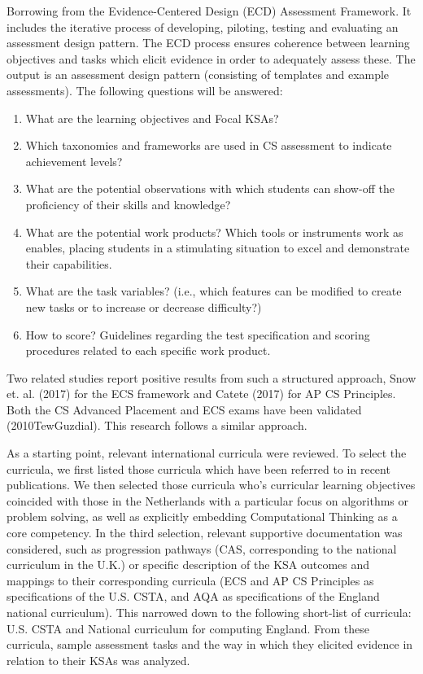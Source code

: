  Borrowing from the Evidence-Centered Design (ECD) Assessment Framework. It includes the iterative process of developing, piloting, testing and evaluating an assessment design pattern. The ECD process ensures coherence between learning objectives and tasks which elicit evidence in order to adequately assess these. The output is an assessment design pattern (consisting of templates and example assessments). The following questions will be answered:

\begin{enumerate}
\item What are the learning objectives and Focal KSAs?
\item Which taxonomies and frameworks are used in CS assessment to indicate achievement levels?
\item What are the potential observations with which students can show-off the proficiency of their skills and knowledge?
\item What are the potential work products? Which tools or instruments work as enables, placing students in a stimulating situation to excel and demonstrate their capabilities.
\item What are the task variables? (i.e., which features can be modified to create new tasks or to increase or decrease difficulty?)
\item How to score? Guidelines regarding the test specification and scoring procedures related to each specific work product.
\end{enumerate}

Two related studies report positive results from such a structured approach, Snow et. al. (2017) for the ECS framework and Catete (2017) for AP CS Principles. Both the CS Advanced Placement and ECS exams have been validated (2010TewGuzdial). This research follows a similar approach. 


As a starting point, relevant international curricula were reviewed. To select the curricula, we first listed those curricula which have been referred to in recent publications. We then selected those curricula who’s curricular learning objectives coincided with those in the Netherlands with a particular focus on algorithms or problem solving, as well as explicitly embedding Computational Thinking as a core competency. In the third selection, relevant supportive documentation was considered, such as progression pathways (CAS, corresponding to the national curriculum in the U.K.) or specific description of the KSA outcomes and mappings to their corresponding curricula (ECS and AP CS Principles as specifications of the U.S. CSTA, and AQA as specifications of the England national curriculum). This narrowed down to the following short-list of curricula: U.S. CSTA and National curriculum for computing England. From these curricula, sample assessment tasks and the way in which they elicited evidence in relation to their KSAs was analyzed.

